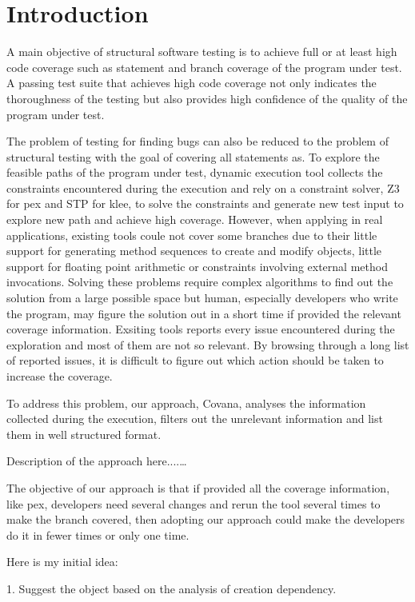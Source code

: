 \section{Introduction}
A main objective of structural software testing is to achieve full or at least high code coverage such as statement and branch coverage of the program under test. A passing test suite that achieves high code coverage not only indicates the thoroughness of the testing but also provides high confidence of the quality of the program under test. 



The problem of testing for finding bugs can also be reduced to the problem of
structural testing with the goal of covering all statements as. To explore the feasible paths of the program under test, dynamic execution tool collects the constraints encountered during the execution and rely on a constraint solver, Z3 for pex and STP for klee, to solve the constraints and generate new test input to explore new path and achieve high coverage. However, when applying in real applications, existing tools coule not cover some branches due to their little support for generating method sequences to create and modify objects, little support for floating point arithmetic or constraints involving external method invocations. Solving these problems require complex algorithms to find out the solution from a large possible space but human, especially developers who write the program, may figure the solution out in a short time if provided the relevant coverage information. Exsiting tools reports every issue encountered during the exploration and most of them are not so relevant. By browsing through a long list of reported issues, it is difficult to figure out which action should be taken to increase the coverage. 

To address this problem, our approach, Covana, analyses the information collected during the execution, filters out the unrelevant information and list them in well structured format. 

Description of the approach here....\dots

The objective of our approach is that if provided all the coverage information, like pex, developers need several changes and rerun the tool several times to make the branch covered, then adopting our approach could make the developers do it in fewer times or only one time.

Here is my initial idea:

1. Suggest the object based on the analysis of creation dependency.

